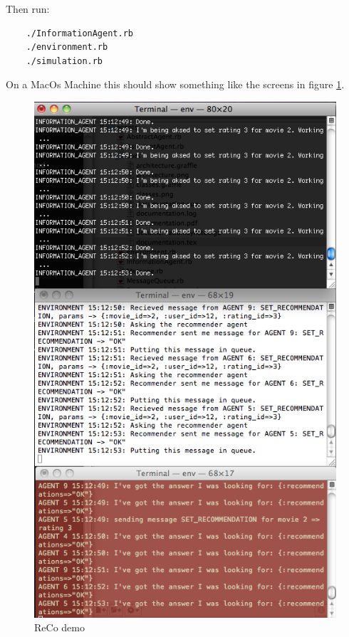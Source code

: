 \documentclass[11pt,a4paper]{article} %
\begin{document}
Then run:
\begin{verbatim}
    ./InformationAgent.rb
    ./environment.rb
    ./simulation.rb
\end{verbatim}

On a MacOs Machine this should show something like the screens in figure \ref{fig:screens}.

\begin{figure}
    \begin{center}
        \includegraphics[scale=0.6]{screens}
        \caption{\small{ReCo demo}\label{fig:screens}}
    \end{center}
\end{figure}


% 
% 
\end{document}

